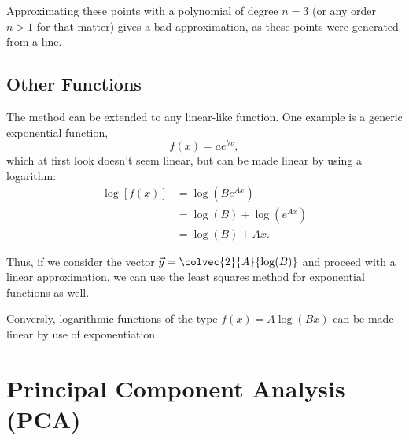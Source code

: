 \begin{warning}
  Approximating these points with a polynomial of degree $n=3$ (or any order $n>1$ for that matter) gives a bad approximation, as these points were generated from a line.
\end{warning}

\subsection{Other Functions}
The method can be extended to any linear-like function. One example is a generic exponential function,
\begin{equation*}
  f(x) = ae^{bx},
\end{equation*}
which at first look doesn't seem linear, but can be made linear by using a logarithm:
\begin{align*}
  \log\left[f(x)\right] &= \log\left( Be^{Ax} \right)\\
  &= \log(B) + \log\left(e^{Ax}\right)\\
  &= \log(B) + Ax. 
\end{align*}

Thus, if we consider the vector $\vec{y}=\colvec{2}{A}{\log(B)}$ and proceed with a linear approximation, we can use the least squares method for exponential functions as well.

Conversly, logarithmic functions of the type $f(x)=A\log(Bx)$ can be made linear by use of exponentiation.

\section{Principal Component Analysis (PCA)}
